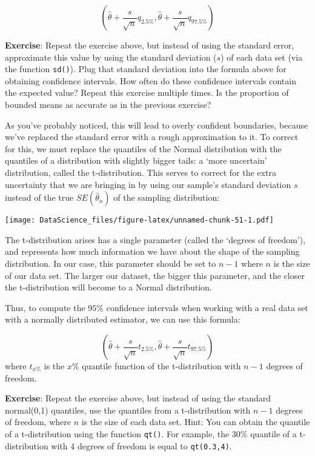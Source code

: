 \documentclass[
]{book}
\begin{document}
\[(\hat{\theta} + \frac{s}{\sqrt{n}}q_{2.5\%}, \hat{\theta} + \frac{s}{\sqrt{n}}q_{97.5\%})\]

\textbf{Exercise}: Repeat the exercise above, but instead of using the standard error, approximate this value by using the standard deviation (\(s\)) of each data set (via the function \texttt{sd()}). Plug that standard deviation into the formula above for obtaining confidence intervals. How often do these confidence intervals contain the expected value? Repeat this exercise multiple times. Is the proportion of bounded means as accurate as in the previous exercise?

As you've probably noticed, this will lead to overly confident boundaries, because we've replaced the standard error with a rough approximation to it. To correct for this, we must replace the quantiles of the Normal distribution with the quantiles of a distribution with slightly bigger tails: a `more uncertain' distribution, called the t-distribution. This serves to correct for the extra uncertainty that we are bringing in by using our sample's standard deviation \(s\) instead of the true \(SE(\hat{\theta}_n)\) of the sampling distribution:

\texttt{[image: DataScience\_files/figure-latex/unnamed-chunk-51-1.pdf]}

The t-distribution arises has a single parameter (called the `degrees of freedom'), and represents how much information we have about the shape of the sampling distribution. In our case, this parameter should be set to \(n-1\) where \(n\) is the size of our data set. The larger our dataset, the bigger this parameter, and the closer the t-distribution will become to a Normal distribution.

Thus, to compute the \(95\%\) confidence intervals when working with a real data set with a normally distributed estimator, we can use this formula:

\[(\hat{\theta} + \frac{s}{\sqrt{n}}t_{2.5\%}, \hat{\theta} + \frac{s}{\sqrt{n}}t_{97.5\%})\]
where \(t_{x\%}\) is the \(x\%\) quantile function of the t-distribution with \(n-1\) degrees of freedom.

\textbf{Exercise}: Repeat the exercise above, but instead of using the standard normal(0,1) quantiles, use the quantiles from a t-distribution with \(n-1\) degrees of freedom, where \(n\) is the size of each data set. Hint: You can obtain the quantile of a t-distribution using the function \texttt{qt()}. For example, the \(30\%\) quantile of a t-distribution with 4 degrees of freedom is equal to \texttt{qt(0.3,4)}.
\end{document}
